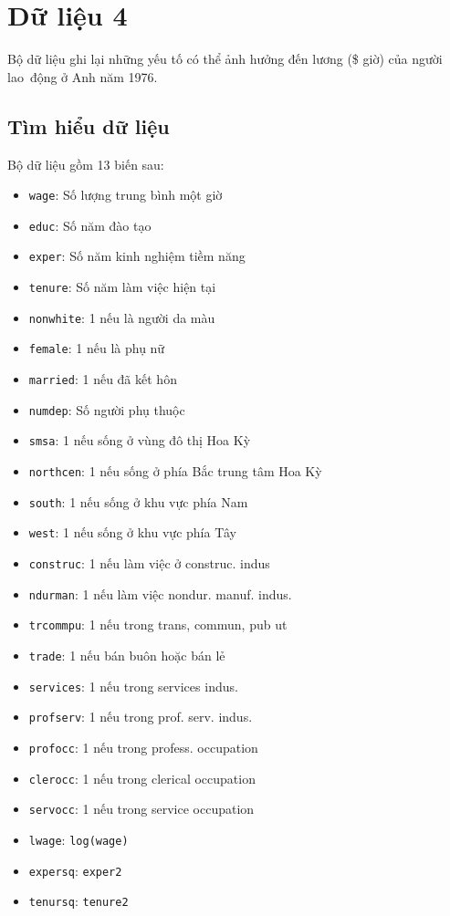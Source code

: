 
\section{Dữ liệu 4}
Bộ dữ liệu ghi lại những yếu tố có thể ảnh hưởng đến lương (\$ giờ) của người lao~động ở Anh năm 1976.

\subsection*{Tìm hiểu dữ liệu}
Bộ dữ liệu gồm 13 biến sau:
\begin{itemize}
	\item \texttt{wage}: Số lượng trung bình một giờ
	\item \texttt{educ}: Số năm đào tạo
	\item \texttt{exper}: Số năm kinh nghiệm tiềm năng
	\item \texttt{tenure}: Số năm làm việc hiện tại
	\item \texttt{nonwhite}: 1 nếu là người da màu
	\item \texttt{female}: 1 nếu là phụ nữ
	\item \texttt{married}: 1 nếu đã kết hôn
	\item \texttt{numdep}: Số người phụ thuộc
	\item \texttt{smsa}: 1 nếu sống ở vùng đô thị Hoa Kỳ
	\item \texttt{northcen}: 1 nếu sống ở phía Bắc trung tâm Hoa Kỳ
	\item \texttt{south}: 1 nếu sống ở khu vực phía Nam
	\item \texttt{west}: 1 nếu sống ở khu vực phía Tây
	\item \texttt{construc}: 1 nếu làm việc ở construc. indus
	\item \texttt{ndurman}: 1 nếu làm việc nondur. manuf. indus.
	\item \texttt{trcommpu}: 1 nếu trong trans, commun, pub ut
	\item \texttt{trade}: 1 nếu bán buôn hoặc bán lẻ
	\item \texttt{services}: 1 nếu trong services indus.
	\item \texttt{profserv}: 1 nếu trong prof. serv. indus.
	\item \texttt{profocc}: 1 nếu trong profess. occupation
	\item \texttt{clerocc}: 1 nếu trong clerical occupation
	\item \texttt{servocc}: 1 nếu trong service occupation
	\item \texttt{lwage}: \texttt{log(wage)}
	\item \texttt{expersq}: \texttt{exper2}
	\item \texttt{tenursq}: \texttt{tenure2}
\end{itemize}

